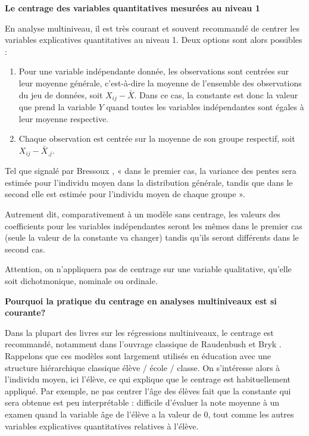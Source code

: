 \documentclass[
  11pt,
  french,
]{book}
\makeatletter
\providecommand{\tightlist}{%
  \setlength{\itemsep}{0pt}\setlength{\parskip}{0pt}}
\newenvironment{kframev}{%
\medskip{}
\setlength{\fboxsep}{.8em}
 \def\at@end@of@kframev{}%
 \ifinner\ifhmode%
  \def\at@end@of@kframev{\end{minipage}}%
  \begin{minipage}{\columnwidth}%
 \fi\fi%
 \def\FrameCommand##1{\hskip\@totalleftmargin \hskip-\fboxsep
 \colorbox{shadebluecolor}{##1}\hskip-\fboxsep
     \hskip-\linewidth \hskip-\@totalleftmargin \hskip\columnwidth}%
 \MakeFramed {\advance\hsize-\width
   \@totalleftmargin\z@ \linewidth\hsize
   \@setminipage}}%
 {\par\unskip\endMakeFramed%
 \at@end@of@kframev}
\newenvironment{rmdblock}[1]
  {
  \begin{itemize}
  \renewcommand{\labelitemi}{
    \raisebox{-.7\height}[0pt][0pt]{
      {\setkeys{Gin}{width=3em,keepaspectratio}\texttt{[image: images/\#1]}}
    }
  }
  \setlength{\fboxsep}{1em}
  \begin{kframev}
  \small
  \item
  }
  {
  \end{kframev}
  \end{itemize}
  }
\newenvironment{bloc_astuce}
  {\begin{rmdblock}{astuce}}
  {\end{rmdblock}}
\makeatother
\begin{document}
\begin{bloc_astuce}

\textbf{Le centrage des variables quantitatives mesurées au niveau 1}

En analyse multiniveau, il est très courant et souvent recommandé de centrer les variables explicatives quantitatives au niveau 1. Deux options sont alors possibles :

\begin{enumerate}
\def\labelenumi{\arabic{enumi}.}
\tightlist
\item
  Pour une variable indépendante donnée, les observations sont centrées sur leur moyenne générale, c'est-à-dire la moyenne de l'ensemble des observations du jeu de données, soit \(X_{ij} - \bar{X}\). Dans ce cas, la constante est donc la valeur que prend la variable \(Y\) quand toutes les variables indépendantes sont égales à leur moyenne respective.
\item
  Chaque observation est centrée sur la moyenne de son groupe respectif, soit \(X_{ij} - \bar{X}_{.j}\).
\end{enumerate}

Tel que signalé par Bressoux \citeyearpar[p.~328]{bressoux2010}, « dans le premier cas, la variance des pentes sera estimée pour l'individu moyen dans la distribution générale, tandis que dans le second elle est estimée pour l'individu moyen de chaque groupe ».

Autrement dit, comparativement à un modèle sans centrage, les valeurs des coefficients pour les variables indépendantes seront les mêmes dans le premier cas (seule la valeur de la constante va changer) tandis qu'ils seront différents dans le second cas.

Attention, on n'appliquera pas de centrage sur une variable qualitative, qu'elle soit dichotmonique, nominale ou ordinale.

\textbf{Pourquoi la pratique du centrage en analyses multiniveaux est si courante?}

Dans la plupart des livres sur les régressions multiniveaux, le centrage est recommandé, notamment dans l'ouvrage classique de Raudenbush et Bryk \citeyearpar{raudenbush2002hierarchical}. Rappelons que ces modèles sont largement utilisés en éducation avec une structure hiérarchique classique élève / école / classe. On s'intéresse alors à l'individu moyen, ici l'élève, ce qui explique que le centrage est habituellement appliqué. Par exemple, ne pas centrer l'âge des élèves fait que la constante qui sera obtenue est peu interprétable : difficile d'évaluer la note moyenne à un examen quand la variable âge de l'élève a la valeur de 0, tout comme les autres variables explicatives quantitatives relatives à l'élève.


\end{bloc_astuce}
\end{document}
